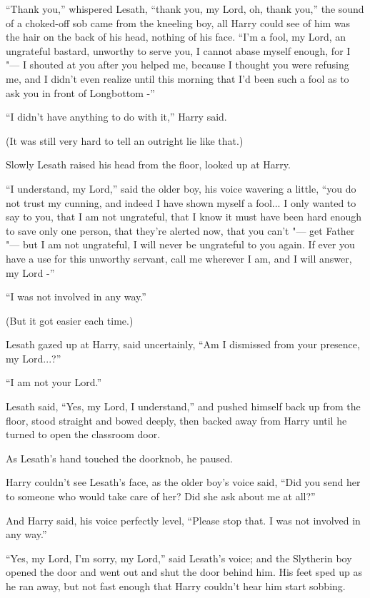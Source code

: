 ``Thank you,'' whispered Lesath, ``thank you, my Lord, oh, thank you,''
the sound of a choked-off sob came from the kneeling boy, all Harry
could see of him was the hair on the back of his head, nothing of his
face. ``I'm a fool, my Lord, an ungrateful bastard, unworthy to serve
you, I cannot abase myself enough, for I "--- I shouted at you after you
helped me, because I thought you were refusing me, and I didn't even
realize until this morning that I'd been such a fool as to ask you in
front of Longbottom -''

``I didn't have anything to do with it,'' Harry said.

(It was still very hard to tell an outright lie like that.)

Slowly Lesath raised his head from the floor, looked up at Harry.

``I understand, my Lord,'' said the older boy, his voice wavering a
little, ``you do not trust my cunning, and indeed I have shown myself a
fool... I only wanted to say to you, that I am not ungrateful, that
I know it must have been hard enough to save only one person, that
they're alerted now, that you can't "--- get Father "--- but I am not
ungrateful, I will never be ungrateful to you again. If ever you have a
use for this unworthy servant, call me wherever I am, and I will answer,
my Lord -''

``I was not involved in any way.''

(But it got easier each time.)

Lesath gazed up at Harry, said uncertainly, ``Am I dismissed from your
presence, my Lord...?''

``I am not your Lord.''

Lesath said, ``Yes, my Lord, I understand,'' and pushed himself back up
from the floor, stood straight and bowed deeply, then backed away from
Harry until he turned to open the classroom door.

As Lesath's hand touched the doorknob, he paused.

Harry couldn't see Lesath's face, as the older boy's voice said, ``Did
you send her to someone who would take care of her? Did she ask about me
at all?''

And Harry said, his voice perfectly level, ``Please stop that. I was not
involved in any way.''

``Yes, my Lord, I'm sorry, my Lord,'' said Lesath's voice; and the
Slytherin boy opened the door and went out and shut the door behind him.
His feet sped up as he ran away, but not fast enough that Harry couldn't
hear him start sobbing.

